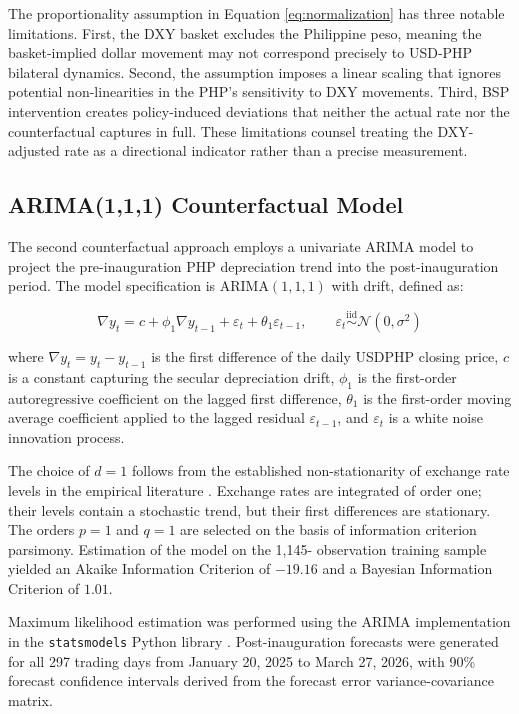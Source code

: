 \documentclass[12pt]{article}
\begin{document}
The proportionality assumption in Equation \ref{eq:normalization} has three notable
limitations. First, the DXY basket excludes the Philippine peso, meaning
the basket-implied dollar movement may not correspond precisely to USD-PHP bilateral
dynamics. Second, the assumption imposes a linear scaling that ignores potential
non-linearities in the PHP's sensitivity to DXY movements. Third, BSP intervention
creates policy-induced deviations that neither the actual rate nor the counterfactual
captures in full. These limitations counsel treating the DXY-adjusted rate as a
directional indicator rather than a precise measurement.

\subsection{ARIMA(1,1,1) Counterfactual Model}

The second counterfactual approach employs a univariate ARIMA model to project the
pre-inauguration PHP depreciation trend into the post-inauguration period. The model
specification is ARIMA$(1,1,1)$ with drift, defined as:

\begin{equation}
  \nabla y_t = c + \phi_1 \nabla y_{t-1} + \varepsilon_t + \theta_1 \varepsilon_{t-1}, \qquad \varepsilon_t \overset{\text{iid}}{\sim} \mathcal{N}(0, \sigma^2)
  \label{eq:arima}
\end{equation}

where $\nabla y_t = y_t - y_{t-1}$ is the first difference of the daily USDPHP
closing price, $c$ is a constant capturing the secular depreciation drift, $\phi_1$
is the first-order autoregressive coefficient on the lagged first difference, $\theta_1$
is the first-order moving average coefficient applied to the lagged residual
$\varepsilon_{t-1}$, and $\varepsilon_t$ is a white noise innovation process.

The choice of $d = 1$ follows from the established non-stationarity of exchange rate
levels in the empirical literature \citep{meese1983}. Exchange rates are
integrated of order one; their levels contain a stochastic trend, but their first
differences are stationary. The orders $p = 1$ and $q = 1$ are selected on the
basis of information criterion parsimony. Estimation of the model on the 1,145-
observation training sample yielded an Akaike Information Criterion of $-19.16$ and
a Bayesian Information Criterion of $1.01$.

Maximum likelihood estimation was performed using the ARIMA implementation in the
\texttt{statsmodels} Python library \citep{seabold2010}. Post-inauguration forecasts
were generated for all 297 trading days from January 20, 2025 to March 27, 2026,
with 90\% forecast confidence intervals derived from the forecast error
variance-covariance matrix.
\end{document}
